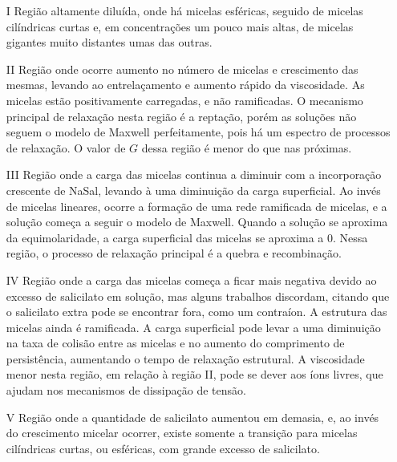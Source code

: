 		\begin{enumerate} 
			\item[I] Região altamente diluída, onde há micelas esféricas, seguido de micelas cilíndricas curtas e, em concentrações um pouco mais altas, de micelas gigantes muito distantes umas das outras.
			\item[II] Região onde ocorre aumento no número de micelas e crescimento das mesmas, levando ao entrelaçamento e aumento rápido da viscosidade. As micelas estão positivamente carregadas, e não ramificadas. O mecanismo principal de relaxação nesta região é a reptação, porém as soluções não seguem o modelo de Maxwell perfeitamente, pois há um espectro de processos de relaxação. \cite{Rehage1988}
			 O valor de \(G\) dessa região é menor do que nas próximas. \cite{Rehage1991}
			\item[III] Região onde a carga das micelas continua a diminuir com a incorporação crescente de NaSal, levando à uma diminuição da carga superficial. Ao invés de micelas lineares, ocorre a formação de uma rede ramificada de micelas, e a solução começa a seguir o modelo de Maxwell. Quando a solução se aproxima da equimolaridade, a carga superficial das micelas se aproxima a 0. Nessa região, o processo de relaxação principal é a quebra e recombinação.
			\item[IV] Região onde a carga das micelas começa a ficar mais negativa devido ao excesso de salicilato em solução\cite{Olsson1986a}, mas alguns trabalhos discordam, citando que o salicilato extra pode se encontrar fora, como um contraíon.\cite{Cassidy1996} A estrutura das micelas ainda é ramificada. %
			A carga superficial pode levar a uma diminuição na taxa de colisão entre as micelas e no aumento do comprimento de persistência, aumentando o tempo de relaxação estrutural. A viscosidade menor nesta região, em relação à região II, pode se dever aos íons \Sal{} livres, que ajudam nos mecanismos de dissipação de tensão.\cite{Shikata1988} 
			\item[V] Região onde a quantidade de salicilato aumentou em demasia, e, ao invés do crescimento micelar ocorrer, existe somente a transição para micelas cilíndricas curtas, ou esféricas, com grande excesso de salicilato.
		\end{enumerate}
		
